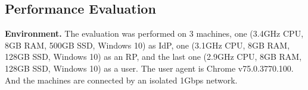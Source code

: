 \subsection{Performance Evaluation}
\label{sec:evaluation}
\noindent\textbf{Environment.} The evaluation was performed on 3 machines, 
one (3.4GHz CPU, 8GB RAM, 500GB SSD, Windows 10) as IdP, 
one (3.1GHz CPU, 8GB RAM, 128GB SSD, Windows 10) as an RP, 
and the last one (2.9GHz CPU, 8GB RAM, 128GB SSD, Windows 10) as a user.
The user agent is Chrome v75.0.3770.100.
And the machines are connected by an isolated 1Gbps network.



